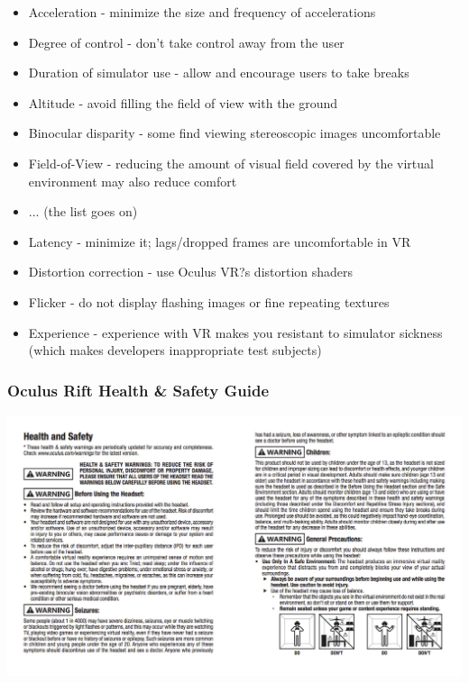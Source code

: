 \begin{frame}
		
	\begin{itemize}
		\item Acceleration - minimize the size and frequency of accelerations
		\item Degree of control - don't take control away from the user
		\item Duration of simulator use - allow and encourage users to take breaks
		\item Altitude - avoid filling the field of view with the ground
		\item Binocular disparity - some find viewing stereoscopic images uncomfortable
		\item Field-of-View - reducing the amount of visual field covered by the virtual environment may also reduce comfort
		\item ... (the list goes on)
	\end{itemize}
	
\end{frame}

\begin{frame}
	\begin{itemize}
		\item Latency - minimize it; lags/dropped frames are uncomfortable in VR
		\item Distortion correction - use Oculus VR?s distortion shaders
		\item Flicker - do not display flashing images or fine repeating textures
		\item Experience - experience with VR makes you resistant to simulator sickness (which makes developers inappropriate test subjects)
	\end{itemize}
\end{frame}

\begin{frame}

	\begin{center}
		\frametitle{Oculus Rift Health \& Safety Guide}
		\href{https://static.oculus.com/documents/310-30023-01_Rift_HealthSafety_English.pdf}{ \includegraphics[scale=.45]{assets/sideeffects}  }
	\end{center}

\end{frame}

